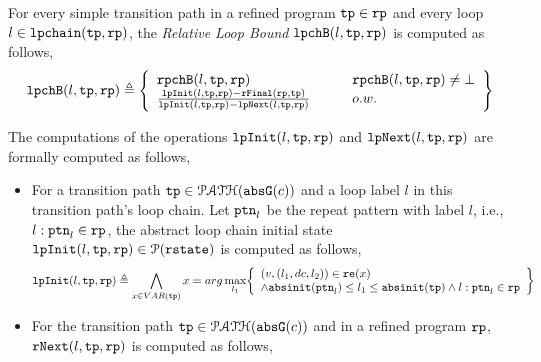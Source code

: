 \begin{enumerate}
\begin{enumerate}
\begin{defn}
  \label{def:relatedloop_bound}
For every simple transition path in a refined program $\mathtt{tp} \in \mathtt{rp}$
and every loop $l \in \mathtt{lpchain}(\mathtt{tp}, \mathtt{rp})$,
the \emph{Relative Loop Bound} $\mathtt{lpchB}(l, \mathtt{tp}, \mathtt{rp})$ is computed as follows,
\[
  \lpchB(l, \tpath, \rprog) \triangleq
  \left\{
  \begin{array}{ll}
    \rpchB(l, \tpath, \rprog)  
    & \qquad \rpchB(l, \tpath, \rprog) \neq \bot
    \\
    \frac{\lpinit(l, \tpath, \rprog) - \rffinal(\rprog, \tpath)}{\lpinit(l, \tpath, \rprog) - \lpnext(l, \tpath, \rprog)}
    & \qquad o.w.
  \end{array}
  \right\}
  \]
\end{defn}
The computations of the operations $\mathtt{lpInit}(l, \mathtt{tp}, \mathtt{rp})$ and $\mathtt{lpNext}(l, \mathtt{tp}, \mathtt{rp})$
are formally computed as follows,
\begin{itemize}
\item For a transition path $\mathtt{tp} \in \mathcal{PATH}(\mathtt{abs}{\mathtt{G}}(c))$ and a loop label $l$ in this transition path's loop chain.
Let $\mathtt{ptn}_l$ be the repeat pattern with label $l$, i.e., $l: \mathtt{ptn}_l \in \mathtt{rp}$, 
the abstract loop chain initial state $\mathtt{lpInit}(l, \mathtt{tp}, \mathtt{rp}) \in \mathcal{P}(\mathtt{rstate})$ is computed as follows,
\[
  \lpinit(l, \tpath, \rprog) \triangleq 
  \bigwedge_{x \in VAR(\tpath)}
  x = arg\max_{l_1}
  \left\{
      \begin{array}{l}
    (v, (l_1, dc, l_2)) \in \reset(x) 
        \\ 
    \land \absinit(\rpattern_l) \leq l_1 \leq \absinit(\tpath)
    \land l: \rpattern_l \in \rprog
    \end{array}
    \right\}
  \]
\item
For the transition path $\mathtt{tp} \in \mathcal{PATH}(\mathtt{abs}{\mathtt{G}}(c))$ and in a refined program $\mathtt{rp}$,
$\mathtt{rNext}(l, \mathtt{tp}, \mathtt{rp})$ is computed as follows,

\end{itemize}
\end{enumerate}
\end{enumerate}
